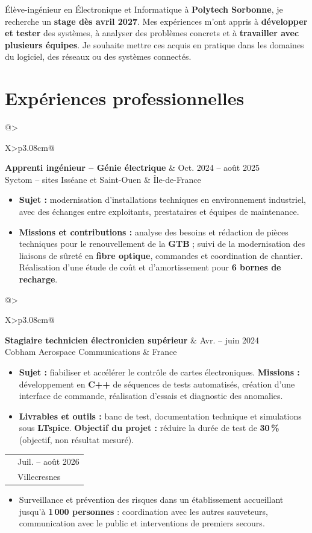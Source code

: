 \documentclass[9pt,a4paper]{extarticle}
\makeatletter
\newcommand{\entry}[4]{%
\begin{tabularx}{\linewidth}{@{}>{\raggedright\arraybackslash}X>{\raggedleft\arraybackslash}p{3.08cm}@{}}
 {\bfseries\color{bleu}#1} & {\fontsize{8.5}{9.3}\selectfont\color{secondaire}#2} \\[-2pt]
 {\fontsize{8.5}{9.6}\selectfont\color{secondaire}#3} & {\fontsize{8.5}{9.3}\selectfont\color{secondaire}#4}
\end{tabularx}\vspace{-3.4pt}\par}
\newcommand{\gapentry}{\vspace{3.1pt}}
\makeatother
\begin{document}
{\fontsize{9.0}{10.7}\selectfont
Élève-ingénieur en Électronique et Informatique à \textbf{Polytech Sorbonne}, je recherche un \textbf{stage dès avril 2027}. Mes expériences m'ont appris à \textbf{développer et tester} des systèmes, à analyser des problèmes concrets et à \textbf{travailler avec plusieurs équipes}. Je souhaite mettre ces acquis en pratique dans les domaines du logiciel, des réseaux ou des systèmes connectés.\par

\section{Expériences professionnelles}
\entry{Apprenti ingénieur -- Génie électrique}{Oct. 2024 -- août 2025}{Syctom -- sites Isséane et Saint-Ouen}{Île-de-France}
\begin{itemize}
  \item \textbf{Sujet :} modernisation d'installations techniques en environnement industriel, avec des échanges entre exploitants, prestataires et équipes de maintenance.
  \item \textbf{Missions et contributions :} analyse des besoins et rédaction de pièces techniques pour le renouvellement de la \textbf{GTB} ; suivi de la modernisation des liaisons de sûreté en \textbf{fibre optique}, commandes et coordination de chantier. Réalisation d'une étude de coût et d'amortissement pour \textbf{6 bornes de recharge}.
\end{itemize}
\gapentry
\entry{Stagiaire technicien électronicien supérieur}{Avr. -- juin 2024}{Cobham Aerospace Communications}{France}
\begin{itemize}
  \item \textbf{Sujet :} fiabiliser et accélérer le contrôle de cartes électroniques. \textbf{Missions :} développement en \textbf{C++} de séquences de tests automatisés, création d'une interface de commande, réalisation d'essais et diagnostic des anomalies.
  \item \textbf{Livrables et outils :} banc de test, documentation technique et simulations sous \textbf{LTspice}. \textbf{Objectif du projet :} réduire la durée de test de \textbf{30\,\%} (objectif, non résultat mesuré).
\end{itemize}
\gapentry
\entry{Surveillant sauveteur aquatique}{Juil. -- août 2026}{Centre aquatique de Villecresnes -- GPSEA}{Villecresnes}
\begin{itemize}
  \item Surveillance et prévention des risques dans un établissement accueillant jusqu'à \textbf{1\,000 personnes} : coordination avec les autres sauveteurs, communication avec le public et interventions de premiers secours.
\end{itemize}

}
\end{document}
